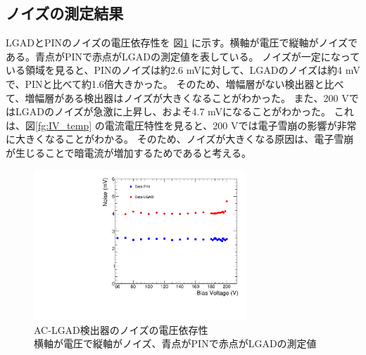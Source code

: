 \subsection{ノイズの測定結果}
LGADとPINのノイズの電圧依存性を 図\ref{fg:NoisevsBias} に示す。横軸が電圧で縦軸がノイズである。青点がPINで赤点がLGADの測定値を表している。
ノイズが一定になっている領域を見ると、PINのノイズは約2.6 mVに対して、LGADのノイズは約4 mVで、PINと比べて約1.6倍大きかった。
そのため、増幅層がない検出器と比べて、増幅層がある検出器はノイズが大きくなることがわかった。
また、200 VではLGADのノイズが急激に上昇し、およそ4.7 mVになることがわかった。
これは、図\ref{fg:IV_temp} の電流電圧特性を見ると、200 Vでは電子雪崩の影響が非常に大きくなることがわかる。
そのため、ノイズが大きくなる原因は、電子雪崩が生じることで暗電流が増加するためであると考える。


\begin{figure}[h]
    \centering
    \includegraphics[width=8cm]{fig/graph/NoisevsVoltage.pdf}
    \caption[AC-LGAD検出器のノイズの電圧依存性]{AC-LGAD検出器のノイズの電圧依存性\\横軸が電圧で縦軸がノイズ、青点がPINで赤点がLGADの測定値}
    \label{fg:NoisevsBias}
\end{figure}

